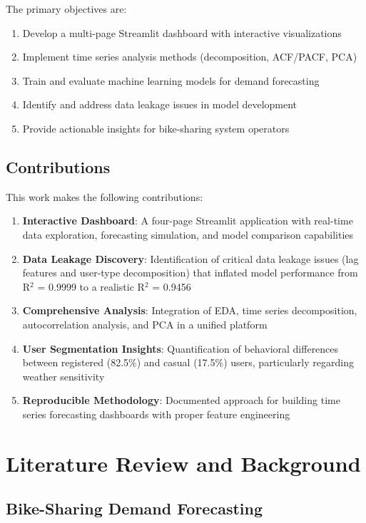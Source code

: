 \documentclass[12pt,a4paper]{article}
\begin{document}
The primary objectives are:
\begin{enumerate}
    \item Develop a multi-page Streamlit dashboard with interactive visualizations
    \item Implement time series analysis methods (decomposition, ACF/PACF, PCA)
    \item Train and evaluate machine learning models for demand forecasting
    \item Identify and address data leakage issues in model development
    \item Provide actionable insights for bike-sharing system operators
\end{enumerate}

\subsection{Contributions}

This work makes the following contributions:
\begin{enumerate}
    \item \textbf{Interactive Dashboard}: A four-page Streamlit application with real-time data exploration, forecasting simulation, and model comparison capabilities
    \item \textbf{Data Leakage Discovery}: Identification of critical data leakage issues (lag features and user-type decomposition) that inflated model performance from R$^2$ = 0.9999 to a realistic R$^2$ = 0.9456
    \item \textbf{Comprehensive Analysis}: Integration of EDA, time series decomposition, autocorrelation analysis, and PCA in a unified platform
    \item \textbf{User Segmentation Insights}: Quantification of behavioral differences between registered (82.5\%) and casual (17.5\%) users, particularly regarding weather sensitivity
    \item \textbf{Reproducible Methodology}: Documented approach for building time series forecasting dashboards with proper feature engineering
\end{enumerate}

\section{Literature Review and Background}

\subsection{Bike-Sharing Demand Forecasting}
\end{document}
